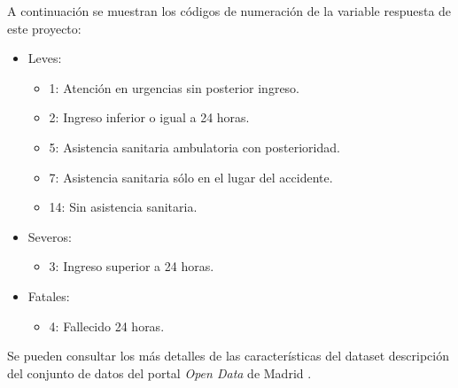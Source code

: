             A continuación se muestran los códigos de numeración de la variable respuesta de este proyecto:

              \begin{itemize}
                    \item Leves:
                        \begin{itemize}
                            \item 1: Atención en urgencias sin posterior ingreso.
                            \item 2: Ingreso inferior o igual a 24 horas.
                            \item 5: Asistencia sanitaria ambulatoria con posterioridad.
                            \item 7: Asistencia sanitaria sólo en el lugar del accidente.
                            \item 14: Sin asistencia sanitaria.
                        \end{itemize}
                    \item Severos:
                        \begin{itemize}
                            \item 3: Ingreso superior a 24 horas.
                        \end{itemize}
                    \item Fatales:
                        \begin{itemize}
                            \item 4: Fallecido 24 horas.
                        \end{itemize}
                \end{itemize}



            Se pueden consultar los más detalles de las características del dataset descripción del conjunto de datos del portal \textit{Open Data} de Madrid \cite{InfoDatasetMadrid}.


